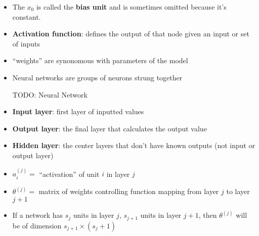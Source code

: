 \begin{itemize}[--]
	\item The $x_0$ is called the \textbf{bias unit} and is sometimes omitted because it's constant.
	\item \textbf{Activation function}: defines the output of that node given an input or set of inputs
	\item ``weights'' are synonomous with parameters of the model
	\item Neural networks are groups of neurons strung together

	TODO: Neural Network

	\item \textbf{Input layer}: first layer of inputted values
	\item \textbf{Output layer}: the final layer that calculates the output value
	\item \textbf{Hidden layer}: the center layers that don't have known outputs (not input or output layer)
	\item $a_i^{(j)}=$ ``activation'' of unit $i$ in layer $j$
	\item $\theta^{(j)}=$ matrix of weights controlling function mapping from layer $j$ to layer $j+1$
	\item If a network has $s_j$ units in layer $j$, $s_{j+1}$ units in layer $j+1$, then $\theta^{(j)}$ will be of dimension $s_{j+1}\times (s_j + 1)$

\end{itemize}
